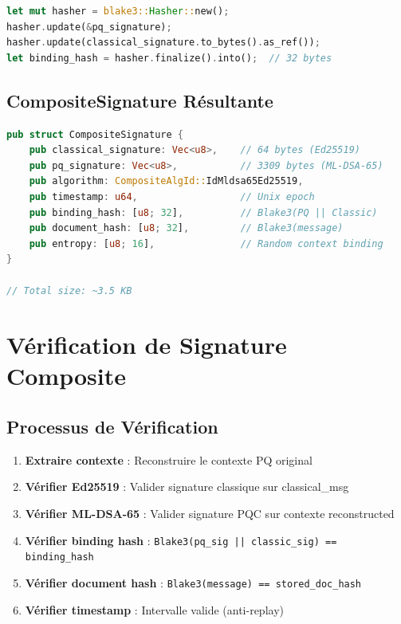 \documentclass[12pt,a4paper]{report}
\begin{document}
\begin{lstlisting}[language=Rust]
let mut hasher = blake3::Hasher::new();
hasher.update(&pq_signature);
hasher.update(classical_signature.to_bytes().as_ref());
let binding_hash = hasher.finalize().into();  // 32 bytes
\end{lstlisting}

\subsection{CompositeSignature Résultante}

\begin{lstlisting}[language=Rust]
pub struct CompositeSignature {
    pub classical_signature: Vec<u8>,    // 64 bytes (Ed25519)
    pub pq_signature: Vec<u8>,           // 3309 bytes (ML-DSA-65)
    pub algorithm: CompositeAlgId::IdMldsa65Ed25519,
    pub timestamp: u64,                  // Unix epoch
    pub binding_hash: [u8; 32],          // Blake3(PQ || Classic)
    pub document_hash: [u8; 32],         // Blake3(message)
    pub entropy: [u8; 16],               // Random context binding
}

// Total size: ~3.5 KB
\end{lstlisting}

\section{Vérification de Signature Composite}

\subsection{Processus de Vérification}

\begin{enumerate}
  \item \textbf{Extraire contexte} : Reconstruire le contexte PQ original
  \item \textbf{Vérifier Ed25519} : Valider signature classique sur classical\_msg
  \item \textbf{Vérifier ML-DSA-65} : Valider signature PQC sur contexte reconstructed
  \item \textbf{Vérifier binding hash} : \texttt{Blake3(pq\_sig || classic\_sig) == binding\_hash}
  \item \textbf{Vérifier document hash} : \texttt{Blake3(message) == stored\_doc\_hash}
  \item \textbf{Vérifier timestamp} : Intervalle valide (anti-replay)
\end{enumerate}
\end{document}
